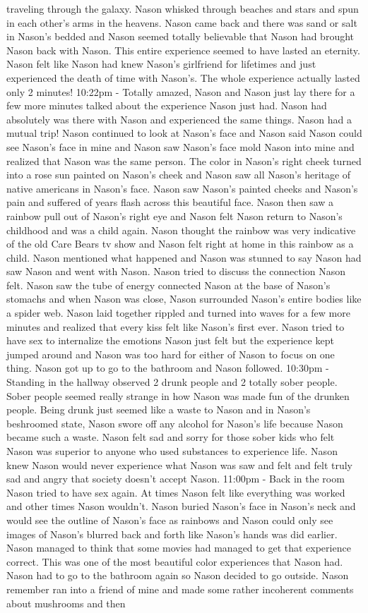 \documentclass[12pt]{book}
\begin{document}
traveling through the galaxy. Nason whisked through beaches and stars and spun in each other's arms in the heavens. Nason came back and there was sand or salt in Nason's bedded and Nason seemed totally believable that Nason had brought Nason back with Nason. This entire experience seemed to have lasted an eternity. Nason felt like Nason had knew Nason's girlfriend for lifetimes and just experienced the death of time with Nason's. The whole experience actually lasted only 2 minutes! 10:22pm - Totally amazed, Nason and Nason just lay there for a few more minutes talked about the experience Nason just had. Nason had absolutely was there with Nason and experienced the same things. Nason had a mutual trip! Nason continued to look at Nason's face and Nason said Nason could see Nason's face in mine and Nason saw Nason's face mold Nason into mine and realized that Nason was the same person. The color in Nason's right cheek turned into a rose sun painted on Nason's cheek and Nason saw all Nason's heritage of native americans in Nason's face. Nason saw Nason's painted cheeks and Nason's pain and suffered of years flash across this beautiful face. Nason then saw a rainbow pull out of Nason's right eye and Nason felt Nason return to Nason's childhood and was a child again. Nason thought the rainbow was very indicative of the old Care Bears tv show and Nason felt right at home in this rainbow as a child. Nason mentioned what happened and Nason was stunned to say Nason had saw Nason and went with Nason. Nason tried to discuss the connection Nason felt. Nason saw the tube of energy connected Nason at the base of Nason's stomachs and when Nason was close, Nason surrounded Nason's entire bodies like a spider web. Nason laid together rippled and turned into waves for a few more minutes and realized that every kiss felt like Nason's first ever. Nason tried to have sex to internalize the emotions Nason just felt but the experience kept jumped around and Nason was too hard for either of Nason to focus on one thing. Nason got up to go to the bathroom and Nason followed. 10:30pm - Standing in the hallway observed 2 drunk people and 2 totally sober people. Sober people seemed really strange in how Nason was made fun of the drunken people. Being drunk just seemed like a waste to Nason and in Nason's beshroomed state, Nason swore off any alcohol for Nason's life because Nason became such a waste. Nason felt sad and sorry for those sober kids who felt Nason was superior to anyone who used substances to experience life. Nason knew Nason would never experience what Nason was saw and felt and felt truly sad and angry that society doesn't accept Nason. 11:00pm - Back in the room Nason tried to have sex again. At times Nason felt like everything was worked and other times Nason wouldn't. Nason buried Nason's face in Nason's neck and would see the outline of Nason's face as rainbows and Nason could only see images of Nason's blurred back and forth like Nason's hands was did earlier. Nason managed to think that some movies had managed to get that experience correct. This was one of the most beautiful color experiences that Nason had. Nason had to go to the bathroom again so Nason decided to go outside. Nason remember ran into a friend of mine and made some rather incoherent comments about mushrooms and then 
\end{document}
